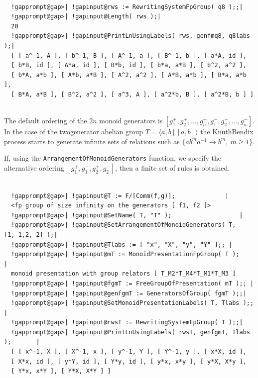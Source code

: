 \documentclass[a4paper,11pt]{report}
\begin{document}
{{{ }

 
\begin{Verbatim}[commandchars=!@|,fontsize=\small,frame=single,label=Example]
  
  !gapprompt@gap>| !gapinput@rws := RewritingSystemFpGroup( q8 );;|
  !gapprompt@gap>| !gapinput@Length( rws );|
  20
  !gapprompt@gap>| !gapinput@PrintLnUsingLabels( rws, genfmq8, q8labs );|
  [ [ a^-1, A ], [ b^-1, B ], [ A^-1, a ], [ B^-1, b ], [ a*A, id ], 
  [ b*B, id ], [ A*a, id ], [ B*b, id ], [ b*a, a*B ], [ b^2, a^2 ], 
  [ b*A, a*b ], [ A*b, a*B ], [ A^2, a^2 ], [ A*B, a*b ], [ B*a, a*b ], 
  [ B*A, a*B ], [ B^2, a^2 ], [ a^3, A ], [ a^2*b, B ], [ a^2*B, b ] ]
  
\end{Verbatim}
 The default ordering of the $2n$ monoid generators is $ [g_1^+,g_2^+,\ldots,g_n^+,g_1^-,g_2^-,\ldots,g_n^-] $. In the case of the two\texttt{}generator abelian group $T = \langle a,b ~|~ [a,b] \rangle$ the Knuth\texttt{}Bendix process starts to generate infinite sets
of relations such as $\{ab^ma^{-1} \to b^m,~ m \geqslant 1\}$. 

 If, using the \texttt{ArrangementOfMonoidGenerators} function, we specify the alternative ordering $ [g_1^+,g_1^-,g_2^+,g_2^-] $, then a finite set of rules is obtained. 

 
\begin{Verbatim}[commandchars=!@|,fontsize=\small,frame=single,label=Example]
  
  !gapprompt@gap>| !gapinput@T := F/[Comm(f,g)];              |
  <fp group of size infinity on the generators [ f1, f2 ]>
  !gapprompt@gap>| !gapinput@SetName( T, "T" );                   |
  !gapprompt@gap>| !gapinput@SetArrangementOfMonoidGenerators( T, [1,-1,2,-2] );|
  !gapprompt@gap>| !gapinput@Tlabs := [ "x", "X", "y", "Y" ];; |
  !gapprompt@gap>| !gapinput@mT := MonoidPresentationFpGroup( T );              |
  monoid presentation with group relators [ T_M2*T_M4*T_M1*T_M3 ]
  !gapprompt@gap>| !gapinput@fgmT := FreeGroupOfPresentation( mT );; |
  !gapprompt@gap>| !gapinput@genfgmT := GeneratorsOfGroup( fgmT );;|
  !gapprompt@gap>| !gapinput@SetMonoidPresentationLabels( T, Tlabs );; |
  !gapprompt@gap>| !gapinput@rwsT := RewritingSystemFpGroup( T );;|
  !gapprompt@gap>| !gapinput@PrintLnUsingLabels( rwsT, genfgmT, Tlabs );       |
  [ [ x^-1, X ], [ X^-1, x ], [ y^-1, Y ], [ Y^-1, y ], [ x*X, id ], 
  [ X*x, id ], [ y*Y, id ], [ Y*y, id ], [ y*x, x*y ], [ y*X, X*y ], 
  [ Y*x, x*Y ], [ Y*X, X*Y ] ]
  

\end{Verbatim}}}
\end{document}
